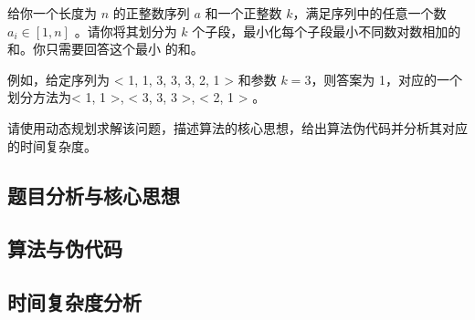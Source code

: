 \documentclass{article}
\begin{document}
给你一个长度为 $n$ 的正整数序列 $a$ 和一个正整数 $k$，满足序列中的任意一个数 $a_i \in [1, n]$ 。请你将其划分为 $k$ 个子段，最小化每个子段最小不同数对数相加的和。你只需要回答这个最小
的和。

例如，给定序列为 < 1, 1, 3, 3, 3, 2, 1 > 和参数 $k = 3$，则答案为 1，对应的一个划分方法为< 1, 1 >, < 3, 3, 3 >, < 2, 1 > 。

请使用动态规划求解该问题，描述算法的核心思想，给出算法伪代码并分析其对应的时间复杂度。

\subsection{题目分析与核心思想}

\subsection{算法与伪代码}

\subsection{时间复杂度分析}
\end{document}
